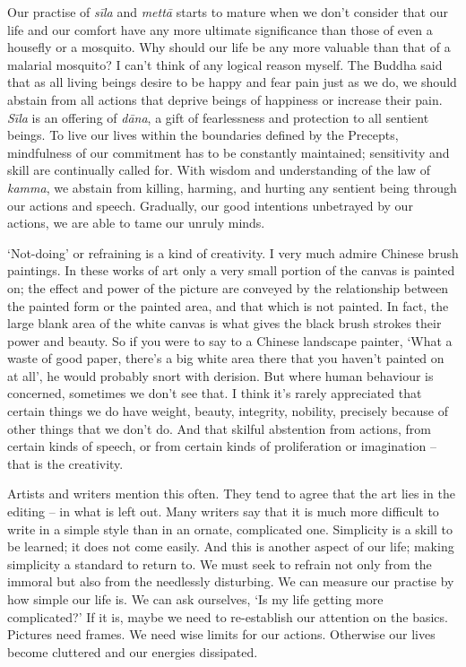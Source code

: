 Our practise of \emph{sīla} and \emph{mettā} starts to mature when we
don't consider that our life and our comfort have any more ultimate
significance than those of even a housefly or a mosquito. Why should our
life be any more valuable than that of a malarial mosquito? I can't
think of any logical reason myself. The Buddha said that as all living
beings desire to be happy and fear pain just as we do, we should abstain
from all actions that deprive beings of happiness or increase their
pain. \emph{Sīla} is an offering of \emph{dāna}, a gift of fearlessness
and protection to all sentient beings. To live our lives within the
boundaries defined by the Precepts, mindfulness of our commitment has to
be constantly maintained; sensitivity and skill are continually called
for. With wisdom and understanding of the law of \emph{kamma}, we
abstain from killing, harming, and hurting any sentient being through
our actions and speech. Gradually, our good intentions unbetrayed by our
actions, we are able to tame our unruly minds. 

`Not-doing' or refraining is a kind of creativity. I very much admire
Chinese brush paintings. In these works of art only a very small portion
of the canvas is painted on; the effect and power of the picture are
conveyed by the relationship between the painted form or the painted
area, and that which is not painted. In fact, the large blank area of
the white canvas is what gives the black brush strokes their power and
beauty. So if you were to say to a Chinese landscape painter, `What a
waste of good paper, there's a big white area there that you haven't
painted on at all', he would probably snort with derision. But where
human behaviour is concerned, sometimes we don't see that. I think it's
rarely appreciated that certain things we do have weight, beauty, 
integrity, nobility, precisely because of other things that we don't do. 
And that skilful abstention from actions, from certain kinds of speech, 
or from certain kinds of proliferation or imagination -- that is the
creativity. 

Artists and writers mention this often. They tend to agree that the art
lies in the editing -- in what is left out. Many writers say that it is
much more difficult to write in a simple style than in an ornate, 
complicated one. Simplicity is a skill to be learned; it does not come
easily. And this is another aspect of our life; making simplicity a
standard to return to. We must seek to refrain not only from the immoral
but also from the needlessly disturbing. We can measure our practise by
how simple our life is. We can ask ourselves, `Is my life getting more
complicated?' If it is, maybe we need to re-establish our attention on
the basics. Pictures need frames. We need wise limits for our actions. 
Otherwise our lives become cluttered and our energies dissipated. 

